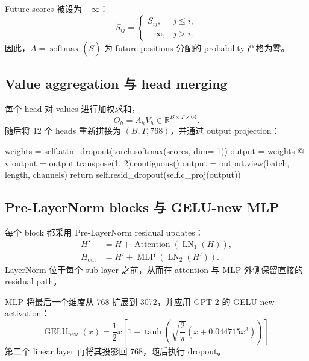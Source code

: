 \documentclass[12pt]{article}
\newcommand{\RSpace}{\mathbb R}
\begin{document}
Future scores 被设为 $-\infty$：
\begin{equation}
\widetilde S_{ij}=\begin{cases}
S_{ij},&j\leq i,\\
-\infty,&j>i.
\end{cases}
\end{equation}
因此，$A=\operatorname{softmax}(\widetilde S)$ 为 future positions 分配的 probability 严格为零。

\subsection{Value aggregation 与 head merging}

每个 head 对 values 进行加权求和，
\begin{equation}
O_h=A_hV_h\in\RSpace^{B\times T\times64}.
\end{equation}
随后将 12 个 heads 重新拼接为 $(B,T,768)$，并通过 output projection：
\begin{pythoncode}[label={lst:attention-output}]
weights = self.attn_dropout(torch.softmax(scores, dim=-1))
output = weights @ v
output = output.transpose(1, 2).contiguous()
output = output.view(batch, length, channels)
return self.resid_dropout(self.c_proj(output))
\end{pythoncode}

\subsection{Pre-LayerNorm blocks 与 GELU-new MLP}

每个 block 都采用 Pre-LayerNorm residual updates：
\begin{equation}
\begin{aligned}
H'&=H+\operatorname{Attention}(\operatorname{LN}_1(H)),\\
H_{\mathrm{out}}&=H'+\operatorname{MLP}(\operatorname{LN}_2(H')).
\end{aligned}
\end{equation}
LayerNorm 位于每个 sub-layer 之前，从而在 attention 与 MLP 外侧保留直接的 residual path。

MLP 将最后一个维度从 768 扩展到 3072，并应用 GPT-2 的 GELU-new activation：
\begin{equation}
\operatorname{GELU}_{\mathrm{new}}(x)
=\frac12x\left[1+\tanh\left(\sqrt{\frac2\pi}
(x+0.044715x^3)\right)\right].
\end{equation}
第二个 linear layer 再将其投影回 768，随后执行 dropout。
\end{document}
